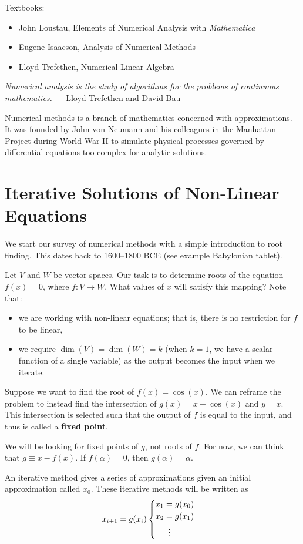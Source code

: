 \documentclass[12pt,letterpaper,DIV=11]{scrartcl}
\theoremstyle{plain}
\theoremstyle{definition}
\theoremstyle{remark}
\begin{document}
\noindent{}Textbooks:
\begin{itemize}
  \item John Loustau, Elements of Numerical Analysis with \emph{Mathematica}
  \item Eugene Isaacson, Analysis of Numerical Methods
  \item Lloyd Trefethen, Numerical Linear Algebra
\end{itemize}

\begin{displayquote}
  \emph{Numerical analysis is the study of algorithms for the problems of continuous mathematics.}
  \hfill --- Lloyd Trefethen and David Bau
\end{displayquote}
Numerical methods is a branch of mathematics concerned with approximations.
It was founded by John von Neumann and his colleagues in the Manhattan Project during World War II to simulate physical processes governed by differential equations too complex for analytic solutions.

\section{Iterative Solutions of Non-Linear Equations}
We start our survey of numerical methods with a simple introduction to root finding.
This dates back to 1600--1800 BCE (see example Babylonian tablet).

Let $V$ and $W$ be vector spaces.
Our task is to determine roots of the equation $f(x) = 0$, where $f : V \to W$.
What values of $x$ will satisfy this mapping?
Note that:
\begin{itemize}
  \item we are working with non-linear equations; that is, there is no restriction for $f$ to be linear,
  \item we require $\dim(V) = \dim(W) = k$ (when $k = 1$, we have a scalar function of a single variable) as the output becomes the input when we iterate.
\end{itemize}
Suppose we want to find the root of $f(x) = \cos(x)$.
We can reframe the problem to instead find the intersection of $g(x) = x - \cos(x)$ and $y = x$.
This intersection is selected such that the output of $f$ is equal to the input, and thus is called a \textbf{fixed point}.

We will be looking for fixed points of $g$, not roots of $f$.
For now, we can think that $g \equiv x - f(x)$.
If $f(\alpha) = 0$, then $g(\alpha) = \alpha$.

An iterative method gives a series of approximations given an initial approximation called $x_0$.
These iterative methods will be written as
\begin{displaymath}
  x_{i + 1} = g(x_i) \begin{cases}
    \begin{aligned}
      x_1 &= g(x_0) \\
      x_2 &= g(x_1) \\
          &\vdotswithin{=} \\
    \end{aligned}
  \end{cases}
\end{displaymath}
\end{document}
